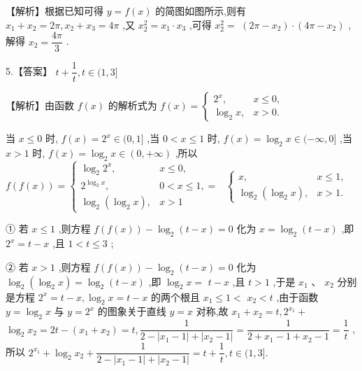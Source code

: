 \documentclass[10pt]{article}
\begin{document}
【解析】根据已知可得 $y = f\left( x\right)$ 的简图如图所示,则有 ${x}_{1} + {x}_{2} = {2\pi },{x}_{2} + {x}_{3} = {4\pi }$ ,又 ${x}_{2}^{2} = {x}_{1} \cdot  {x}_{3}$ ,可得 ${x}_{2}^{2} =$  $\left( {{2\pi } - {x}_{2}}\right)  \cdot  \left( {{4\pi } - {x}_{2}}\right)$ ,解得 ${x}_{2} = \dfrac{4\pi }{3}$ .

5.【答案】 $t + \dfrac{1}{t},t \in  (1,3\rbrack$

【解析】由函数 $f\left( x\right)$ 的解析式为 $f\left( x\right)  = \left\{  \begin{array}{ll} {2}^{x}, & x \leq  0, \\  {\log }_{2}x, & x > 0. \end{array}\right.$

当 $x \leq  0$ 时, $f\left( x\right)  = {2}^{x} \in  (0,1\rbrack$ ,当 $0 < x \leq  1$ 时, $f\left( x\right)  = {\log }_{2}x \in  ( - \infty ,0\rbrack$ ,当 $x > 1$ 时, $f\left( x\right)  = {\log }_{2}x \in  \left( {0, + \infty }\right)$ ,所以 $f\left( {f\left( x\right) }\right)  = \left\{  \begin{array}{ll} {\log }_{2}{2}^{x}, & x \leq  0, \\  {2}^{{\log }_{2}x}, & 0 < x \leq  1, = \\  {\log }_{2}\left( {{\log }_{2}x}\right) , & x > 1 \end{array}\right.$  $\left\{  \begin{array}{ll} x, & x \leq  1, \\  {\log }_{2}\left( {{\log }_{2}x}\right) , & x > 1. \end{array}\right.$

① 若 $x \leq  1$ ,则方程 $f\left( {f\left( x\right) }\right)  - {\log }_{2}\left( {t - x}\right)  = 0$ 化为 $x = {\log }_{2}\left( {t - x}\right)$ ,即 ${2}^{x} = t - x$ ,且 $1 < t \leq  3$ ;

② 若 $x > 1$ ,则方程 $f\left( {f\left( x\right) }\right)  - {\log }_{2}\left( {t - x}\right)  = 0$ 化为 ${\log }_{2}\left( {{\log }_{2}x}\right)  = {\log }_{2}\left( {t - x}\right)$ ,即 ${\log }_{2}x =$  $t - x$ ,且 $t > 1$ ,于是 ${x}_{1}\text{ 、 }{x}_{2}$ 分别是方程 ${2}^{x} = t - x,{\log }_{2}x = t - x$ 的两个根且 ${x}_{1} \leq  1 <$  ${x}_{2} < t$ ,由于函数 $y = {\log }_{2}x$ 与 $y = {2}^{x}$ 的图象关于直线 $y = x$ 对称,故 ${x}_{1} + {x}_{2} = t,{2}^{{x}_{1}} +$  ${\log }_{2}{x}_{2} = {2t} - \left( {{x}_{1} + {x}_{2}}\right)  = t,\dfrac{1}{2 - \left| {{x}_{1} - 1}\right|  + \left| {{x}_{2} - 1}\right| } = \dfrac{1}{2 + {x}_{1} - 1 + {x}_{2} - 1} = \dfrac{1}{t}$ ,所以 ${2}^{{x}_{1}} + {\log }_{2}{x}_{2} + \dfrac{1}{2 - \left| {{x}_{1} - 1}\right|  + \left| {{x}_{2} - 1}\right| } = t + \dfrac{1}{t},t \in  (1,3\rbrack .$
\end{document}
